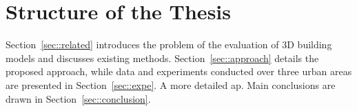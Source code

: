     \section{Structure of the Thesis}
        Section~\ref{sec::related} introduces the problem of the evaluation of 3D building models and discusses existing methods. Section~\ref{sec::approach} details the proposed approach, while data and experiments conducted over three urban areas are presented in Section~\ref{sec::expe}. A more detailed ap. Main conclusions are drawn in Section~\ref{sec::conclusion}.

